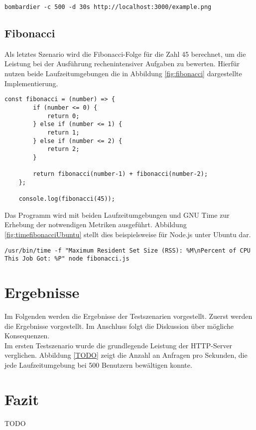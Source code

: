 \begin{lstlisting}[caption={Bombardier File-Server},label={fig:bombardierFileServer}]
	bombardier -c 500 -d 30s http://localhost:3000/example.png
\end{lstlisting}

\subsection{Fibonacci} \label{subsec:fibonacci}
Als letztes Szenario wird die Fibonacci-Folge für die Zahl 45 berechnet, um die Leistung bei der Ausführung rechenintensiver Aufgaben zu bewerten. Hierfür nutzen beide Laufzeitumgebungen die in Abbildung \ref{fig:fibonacci} dargestellte Implementierung.

\begin{lstlisting}[caption={Berechnung der Fibonacci-Folge},label={fig:fibonacci}]
	const fibonacci = (number) => {
		if (number <= 0) {
			return 0;
		} else if (number <= 1) {
			return 1;
		} else if (number <= 2) {
			return 2;
		}
		
		return fibonacci(number-1) + fibonacci(number-2);
	};
	
	console.log(fibonacci(45));
\end{lstlisting}

\noindent
Das Programm wird mit beiden Laufzeitumgebungen und GNU Time zur Erhebung der notwendigen Metriken ausgeführt. Abbildung \ref{fig:timefibonacciUbuntu} stellt dies beispielsweise für Node.js unter Ubuntu dar.
\begin{lstlisting}[caption={Fibonacci Node.js},label={fig:timefibonacciUbuntu}]
	/usr/bin/time -f "Maximum Resident Set Size (RSS): %M\nPercent of CPU This Job Got: %P" node fibonacci.js
\end{lstlisting}

\section{Ergebnisse} \label{sec:performance-results}
Im Folgenden werden die Ergebnisse der Testszenarien vorgestellt. Zuerst werden die Ergebnisse vorgestellt. Im Anschluss folgt die Diskussion über mögliche Konsequenzen.\\

\noindent
Im ersten Testszenario wurde die grundlegende Leistung der HTTP-Server verglichen. Abbildung \ref{TODO} zeigt die Anzahl an Anfragen pro Sekunden, die jede Laufzeitumgebung bei 500 Benutzern bewältigen konnte.

\section{Fazit} \label{sec:performance-conclusion}
TODO \\